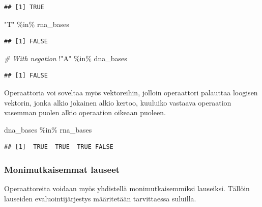 \documentclass[
]{book}
\newenvironment{Shaded}{\begin{snugshade}}{\end{snugshade}}
\newcommand{\CommentTok}[1]{\textcolor[rgb]{0.56,0.35,0.01}{\textit{#1}}}
\newcommand{\NormalTok}[1]{#1}
\newcommand{\SpecialCharTok}[1]{\textcolor[rgb]{0.00,0.00,0.00}{#1}}
\newcommand{\StringTok}[1]{\textcolor[rgb]{0.31,0.60,0.02}{#1}}
\begin{document}
\begin{verbatim}
## [1] TRUE
\end{verbatim}

\begin{Shaded}
\begin{Highlighting}[]
\StringTok{"T"} \SpecialCharTok{\%in\%}\NormalTok{ rna\_bases}
\end{Highlighting}
\end{Shaded}

\begin{verbatim}
## [1] FALSE
\end{verbatim}

\begin{Shaded}
\begin{Highlighting}[]
\CommentTok{\# With negation}
\SpecialCharTok{!}\StringTok{"A"} \SpecialCharTok{\%in\%}\NormalTok{ dna\_bases}
\end{Highlighting}
\end{Shaded}

\begin{verbatim}
## [1] FALSE
\end{verbatim}

Operaattoria voi soveltaa myös vektoreihin, jolloin operaattori palauttaa loogisen vektorin, jonka alkio jokainen alkio kertoo, kuuluiko vastaava operaation vasemman puolen alkio operaation oikeaan puoleen.

\begin{Shaded}
\begin{Highlighting}[]
\NormalTok{dna\_bases }\SpecialCharTok{\%in\%}\NormalTok{ rna\_bases}
\end{Highlighting}
\end{Shaded}

\begin{verbatim}
## [1]  TRUE  TRUE  TRUE FALSE
\end{verbatim}

\hypertarget{monimutkaisemmat-lauseet}{%
\subsubsection{Monimutkaisemmat lauseet}\label{monimutkaisemmat-lauseet}}

Operaattoreita voidaan myös yhdistellä monimutkaisemmiksi lauseiksi. Tällöin lauseiden evaluointijärjestys määritetään tarvittaessa suluilla.
\end{document}
